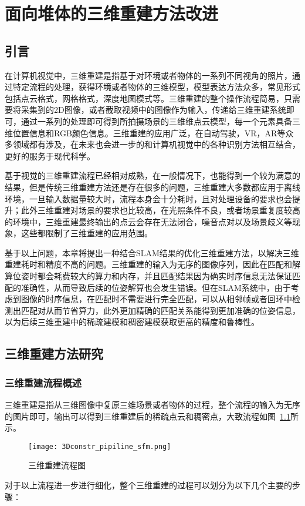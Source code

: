 \chapter{面向堆体的三维重建方法改进}
\label{cha:chap3}
\section{引言}
\label{sec:3.1}
在计算机视觉中，三维重建是指基于对环境或者物体的一系列不同视角的照片，通过特定流程的处理，获得环境或者物体的三维模型，模型表达方法众多，常见形式包括点云格式，网格格式，深度地图模式等。三维重建的整个操作流程简易，只需要将采集到的2D图像，或者截取视频中的图像作为输入，传递给三维重建系统即可，通过一系列的处理即可得到所拍摄场景的三维维点云模型，每一个元素具备三维位置信息和RGB颜色信息。三维重建的应用广泛，在自动驾驶，VR，AR等众多领域都有涉及，在未来也会进一步的和计算机视觉中的各种识别方法相互结合，更好的服务于现代科学。

基于视觉的三维重建流程已经相对成熟，在一般情况下，也能得到一个较为满意的结果，但是传统三维重建方法还是存在很多的问题，三维重建大多数都应用于离线环境，一旦输入数据量较大时，流程本身会十分耗时，且对处理设备的要求也会提升；此外三维重建对场景的要求也比较高，在光照条件不良，或者场景重复度较高的环境中，三维重建最终输出的点云会存在无法闭合，噪音点对以及场景歧义等现象，这些都限制了三维重建的应用范围。

基于以上问题，本章将提出一种结合SLAM结果的优化三维重建方法，以解决三维重建耗时和精度不高的问题。三维重建的输入为无序的图像序列，因此在匹配和解算位姿时都会耗费较大的算力和内存，并且匹配结果因为确实时序信息无法保证匹配的准确性，从而导致后续的位姿解算也会发生错误。但在SLAM系统中，由于考虑到图像的时序信息，在匹配时不需要进行完全匹配，可以从相邻帧或者回环中检测出匹配对从而节省算力，此外更加精确的匹配关系能得到更加准确的位姿信息，以为后续三维重建中的稀疏建模和稠密建模获取更高的精度和鲁棒性。
\section{三维重建方法研究}
\label{sec:3.2}
\subsection{三维重建流程概述}
\label{sec:3.2.1}
三维重建是指从三维图像中复原三维场景或者物体的过程，整个流程的输入为无序的图片即可，输出可以得到三维重建后的稀疏点云和稠密点，大致流程如图~\ref{fig:3Dconstr_pipiline_sfm}所示。
\begin{figure}[H] %
    \centering
    \texttt{[image: 3Dconstr\_pipiline\_sfm.png]}
    \caption{三维重建流程图}
    \label{fig:3Dconstr_pipiline_sfm}
\end{figure}
对于以上流程进一步进行细化，整个三维重建的过程可以划分为以下几个主要的步骤：

